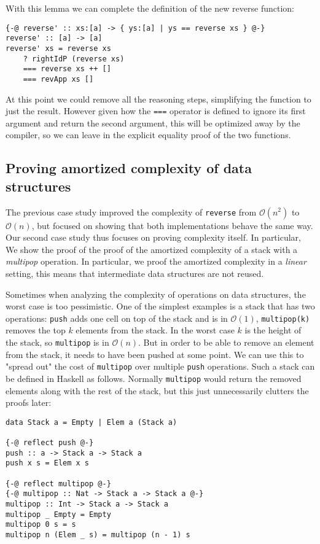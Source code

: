 \documentclass[acmlarge,screen,authorversion=true,nonacm=true]{acmart}
\renewcommand\O[1]{$\mathcal{O}(#1)$}
\begin{document}
With this lemma we can complete the definition of the new reverse function:

\begin{lstlisting}
{-@ reverse' :: xs:[a] -> { ys:[a] | ys == reverse xs } @-}
reverse' :: [a] -> [a]
reverse' xs = reverse xs
    ? rightIdP (reverse xs)
    === reverse xs ++ []
    === revApp xs []
\end{lstlisting}

At this point we could remove all the reasoning steps, simplifying the function to just the result. However given how the \texttt{===} operator is defined to ignore its first argument and return the second argument, this will be optimized away by the compiler, so we can leave in the explicit equality proof of the two functions.

\subsection{Proving amortized complexity of data structures}\label{sec:complexity}

The previous case study improved the complexity of \texttt{reverse} from \O{n^2} to \O{n}, but focused on showing that both implementations behave the same way. Our second case study thus focuses on proving complexity itself. In particular, We show the proof of the proof of the amortized complexity of a stack with a \textit{multipop} operation. In particular, we proof the amortized complexity in a \textit{linear} setting, this means that intermediate data structures are not reused.

Sometimes when analyzing the complexity of operations on data structures, the worst case is too pessimistic. One of the simplest examples is a stack that has two operations: \texttt{push} adds one cell on top of the stack and is in \O{1}, \texttt{multipop(k)} removes the top $k$ elements from the stack. In the worst case $k$ is the height of the stack, so \texttt{multipop} is in \O{n}. But in order to be able to remove an element from the stack, it needs to have been pushed at some point. We can use this to "spread out" the cost of \texttt{multipop} over multiple \texttt{push} operations. Such a stack can be defined in Haskell as follows. Normally \texttt{multipop} would return the removed elements along with the rest of the stack, but this just unnecessarily clutters the proofs later:

\begin{lstlisting}
data Stack a = Empty | Elem a (Stack a)

{-@ reflect push @-}
push :: a -> Stack a -> Stack a
push x s = Elem x s

{-@ reflect multipop @-}
{-@ multipop :: Nat -> Stack a -> Stack a @-}
multipop :: Int -> Stack a -> Stack a
multipop _ Empty = Empty
multipop 0 s = s
multipop n (Elem _ s) = multipop (n - 1) s
\end{lstlisting}
\end{document}
